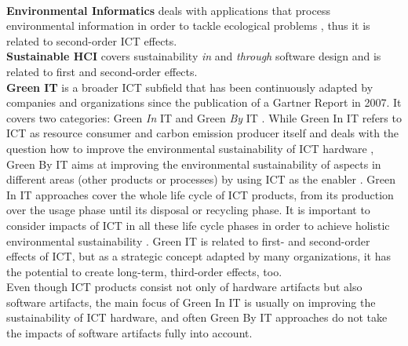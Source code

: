 \documentclass[oribibl]{llncs}
\begin{document}
\\\textbf{Environmental Informatics} deals with applications that process environmental information in order to tackle ecological problems \cite{hilty11}, thus it is related to second-order ICT effects.
\\\textbf{Sustainable HCI} covers sustainability \textit{in} and \textit{through} software design \cite{hilty11} and is related to first and second-order effects.
\\\textbf{Green IT} is a broader ICT subfield that has been continuously adapted by companies and organizations %
since the publication of a Gartner Report %
\cite{gartner07} in 2007. It covers two categories: Green \textit{In} IT and Green \textit{By} IT \cite{hilty11}. While Green In IT refers to ICT as resource consumer and carbon emission producer itself and deals with the question how to improve the environmental sustainability of ICT hardware \cite{calero_green_2015}, Green By IT aims at improving the environmental sustainability of aspects in different areas (other products or processes) by using ICT as the enabler \cite{hilty11}. Green In IT approaches cover the whole life cycle of ICT products, from its production over the usage phase until its disposal or recycling phase. It is important to consider impacts of ICT in all these life cycle phases in order to achieve holistic environmental sustainability \cite{hilty11}. Green IT is related to first- and second-order effects of ICT, but as a strategic concept adapted by many organizations, it has the potential to create long-term, third-order effects, too.\\
Even though ICT products consist not only of hardware artifacts but also software artifacts, the main focus of Green In IT is usually on improving the sustainability of ICT hardware, %
and often Green By IT approaches do not take the impacts of software artifacts fully into account. %
\end{document}

